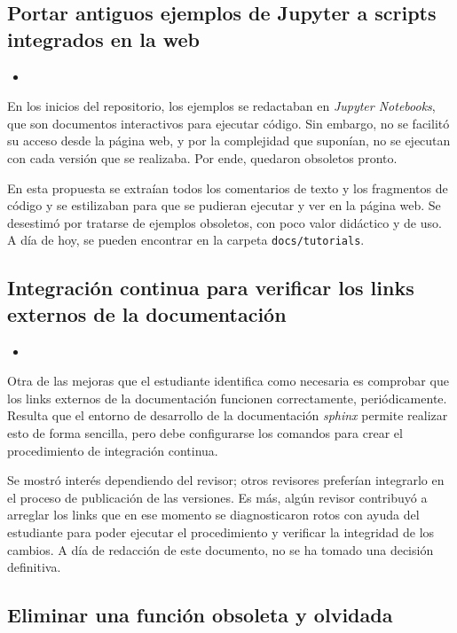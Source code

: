 \subsection{Portar antiguos ejemplos de Jupyter a scripts integrados en la web}

\begin{itemize}
    \item {}
\end{itemize}

En los inicios del repositorio, los ejemplos se redactaban en \textit{Jupyter Notebooks}, que son documentos interactivos para ejecutar código. Sin embargo, no se facilitó su acceso desde la página web, y por la complejidad que suponían, no se ejecutan con cada versión que se realizaba. Por ende, quedaron obsoletos pronto.

En esta propuesta se extraían todos los comentarios de texto y los fragmentos de código y se estilizaban para que se pudieran ejecutar y ver en la página web. Se desestimó por tratarse de ejemplos obsoletos, con poco valor didáctico y de uso. A día de hoy, se pueden encontrar en la carpeta \texttt{docs/tutorials}.

\subsection{Integración continua para verificar los links externos de la documentación}

\begin{itemize}
    \item {}
\end{itemize}

Otra de las mejoras que el estudiante identifica como necesaria es comprobar que los links externos de la documentación funcionen correctamente, periódicamente. Resulta que el entorno de desarrollo de la documentación \textit{sphinx} permite realizar esto de forma sencilla, pero debe configurarse los comandos para crear el procedimiento de integración continua.

Se mostró interés dependiendo del revisor; otros revisores preferían integrarlo en el proceso de publicación de las versiones. Es más, algún revisor contribuyó a arreglar los links que en ese momento se diagnosticaron rotos con ayuda del estudiante para poder ejecutar el procedimiento y verificar la integridad de los cambios. A día de redacción de este documento, no se ha tomado una decisión definitiva.

\subsection{Eliminar una función obsoleta y olvidada}

